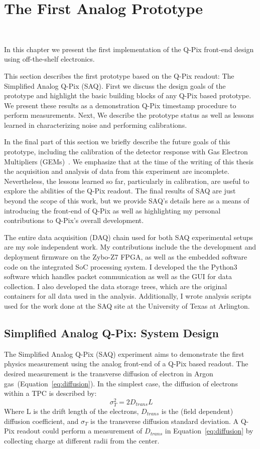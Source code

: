 \chapter{The First Analog Prototype}~\label{chap:saq}

In this chapter we present the first implementation of the Q-Pix front-end design using off-the-shelf electronics.

This section describes the first prototype based on the Q-Pix readout: The Simplified Analog Q-Pix (SAQ).
First we discuss the design goals of the prototype and highlight the basic building blocks of any Q-Pix based prototype.
We present these results as a demonstration Q-Pix timestamp procedure to perform measurements.
Next, We describe the prototype status as well as lessons learned in characterizing noise and performing calibrations.

In the final part of this section we briefly describe the future goals of this prototype, including the calibration of the detector response with Gas Electron Multipliers (GEMs)~\citep{SAULI20162}.
We emphasize that at the time of the writing of this thesis the acquisition and analysis of data from this experiment are incomplete.
Nevertheless, the lessons learned so far, particularly in calibration, are useful to explore the abilities of the Q-Pix readout.
The final results of SAQ are just beyond the scope of this work, but we provide SAQ's details here as a means of introducing the front-end of Q-Pix as well as highlighting my personal contributions to Q-Pix's overall development.

The entire data acquisition (DAQ) chain used for both SAQ experimental setups are my sole independent work.
My contributions include the the development and deployment firmware on the Zybo-Z7 FPGA, as well as the embedded software code on the integrated SoC processing system.
I developed the the Python3 software which handles packet communication as well as the GUI for data collection.
I also developed the data storage trees, which are the original containers for all data used in the analysis. 
Additionally, I wrote analysis scripts used for the work done at the SAQ site at the University of Texas at Arlington.

\section{Simplified Analog Q-Pix: System Design}

The Simplified Analog Q-Pix (SAQ) experiment aims to demonstrate the first physics measurement using the analog front-end of a Q-Pix based readout.
The desired measurement is the transverse diffusion of electron in Argon gas~(Equation~\ref{eq:diffusion}).
In the simplest case, the diffusion of electrons within a TPC is described by:
\begin{equation}~\label{eq:diffusion}
 \sigma^{2}_{T} = 2D_{trans}L
\end{equation}
Where L is the drift length of the electrons, $D_{trans}$ is the (field dependent) diffusion coefficient, and $\sigma_{T}$ is the transverse diffusion standard deviation.
A Q-Pix readout could perform a measurement of $D_{trans}$ in Equation~\ref{eq:diffusion} by collecting charge at different radii from the center.

